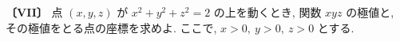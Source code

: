 \noindent\textbf{〔VII〕}
点 $(x,y,z)$ が $x^2+y^2+z^2=2$ の上を動くとき,
関数 $xyz$ の極値と, その極値をとる点の座標を求めよ.
ここで, $x>0,\ y>0,\ z>0$ とする.

